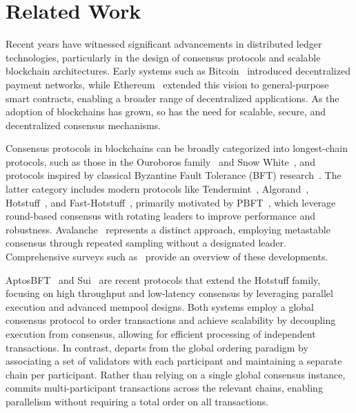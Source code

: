 \section{Related Work}
\label{sec:relatedwork}


Recent years have witnessed significant advancements in distributed ledger technologies, particularly in the design of consensus protocols and scalable blockchain architectures. Early systems such as Bitcoin~\cite{Nakamoto09} introduced decentralized payment networks, while Ethereum~\cite{But15} extended this vision to general-purpose smart contracts, enabling a broader range of decentralized applications. As the adoption of blockchains has grown, so has the need for scalable, secure, and decentralized consensus mechanisms.

Consensus protocols in blockchains can be broadly categorized into longest-chain protocols, such as those in the Ouroboros family~\cite{KRDO17, DGKR18, BGKRZ18} and Snow White~\cite{DPS19}, and protocols inspired by classical Byzantine Fault Tolerance (BFT) research~\cite{Bra87, LSP82, CL99}. The latter category includes modern protocols like Tendermint~\cite{BKM18}, Algorand~\cite{GHMVZ17}, Hotstuff~\cite{YMRGA19}, and Fast-Hotstuff~\cite{JNFG23}, primarily motivated by PBFT~\cite{CL99}, which leverage round-based consensus with rotating leaders to improve performance and robustness. Avalanche~\cite{Roc20} represents a distinct approach, employing metastable consensus through repeated sampling without a designated leader. Comprehensive surveys such as~\cite{BS+19} provide an overview of these developments.

AptosBFT~\cite{Aptos22} and Sui~\cite{Sui22} are recent protocols that extend the Hotstuff family, focusing on high throughput and low-latency consensus by leveraging parallel execution and advanced mempool designs. Both systems employ a global consensus protocol to order transactions and achieve scalability by decoupling execution from consensus, allowing for efficient processing of independent transactions. In contrast, \codename{} departs from the global ordering paradigm by associating a set of validators with each participant and maintaining a separate chain per participant. Rather than relying on a single global consensus instance, \codename{} commits multi-participant transactions across the relevant chains, enabling parallelism without requiring a total order on all transactions.

